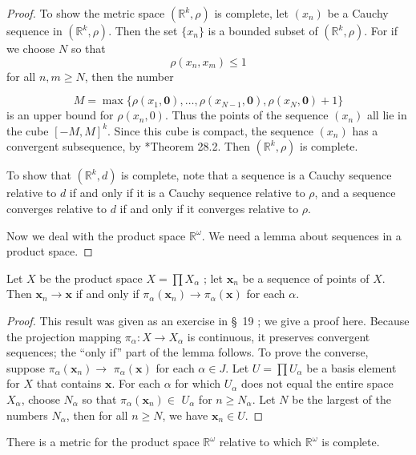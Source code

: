 \begin{proof}
 To show the metric space \(({\mathbb{R}^{k},\rho })\) is complete, let \((x_{n})\) be a Cauchy sequence in \(({\mathbb{R}^{k},\rho })\). Then the set \(\{ x_{n}\}\) is a bounded subset of \(({\mathbb{R}^{k},\rho })\). For if we choose \(N\) so that
\[
\rho ({x_{n},x_{m}}) \leq 1
\]
for all \(n,m \geq N\), then the number

\[
M = \max \{ {\rho ({x_{1},\mathbf{0}}),\ldots ,\rho ({x_{N - 1},\mathbf{0}}),\rho ({x_{N},\mathbf{0}}) + 1}\}
\]
is an upper bound for \(\rho ({x_{n},0})\). Thus the points of the sequence \((x_{n})\) all lie in the cube \({[ -M,M] }^{k}\). Since this cube is compact, the sequence \((x_{n})\) has a convergent subsequence, by *Theorem 28.2. Then \(({\mathbb{R}^{k},\rho })\) is complete.

To show that \(({\mathbb{R}^{k},d})\) is complete, note that a sequence is a Cauchy sequence relative to \(d\) if and only if it is a Cauchy sequence relative to \(\rho\), and a sequence converges relative to \(d\) if and only if it converges relative to \(\rho\).

Now we deal with the product space \(\mathbb{R}^{\omega }\). We need a lemma about sequences in a product space.
\end{proof}
\begin{lemma}
\label{lem:\thetheorem}
 Let \(X\) be the product space \(X = \prod {X}_{\alpha }\) ; let \(\mathbf{x}_{n}\) be a sequence of points of \(X\). Then \(\mathbf{x}_{n} \rightarrow \mathbf{x}\) if and only if \({\pi }_{\alpha }(\mathbf{x}_{n}) \rightarrow {\pi }_{\alpha }( \mathbf{x})\) for each \(\alpha\).
\end{lemma}

\begin{proof}
 This result was given as an exercise in \S\ 19 ; we give a proof here. Because the projection mapping \({\pi }_{\alpha } : X \rightarrow {X}_{\alpha }\) is continuous, it preserves convergent sequences; the ``only if'' part of the lemma follows. To prove the converse, suppose \({\pi }_{\alpha }(\mathbf{x}_{n}) \rightarrow\) \({\pi }_{\alpha }( \mathbf{x})\) for each \(\alpha \in J\). Let \(U = \prod {U}_{\alpha }\) be a basis element for \(X\) that contains \(\mathbf{x}\). For each \(\alpha\) for which \(U_{\alpha }\) does not equal the entire space \(X_{\alpha }\), choose \(N_{\alpha }\) so that \({\pi }_{\alpha }(\mathbf{x}_{n}) \in\) \(U_{\alpha }\) for \(n \geq {N}_{\alpha }\). Let \(N\) be the largest of the numbers \(N_{\alpha }\), then for all \(n \geq N\), we have \(\mathbf{x}_{n} \in U\).
\end{proof}
\begin{theorem}
\label{thm:\thetheorem}
 There is a metric for the product space \(\mathbb{R}^{\omega }\) relative to which \(\mathbb{R}^{\omega }\) is complete.
\end{theorem}

